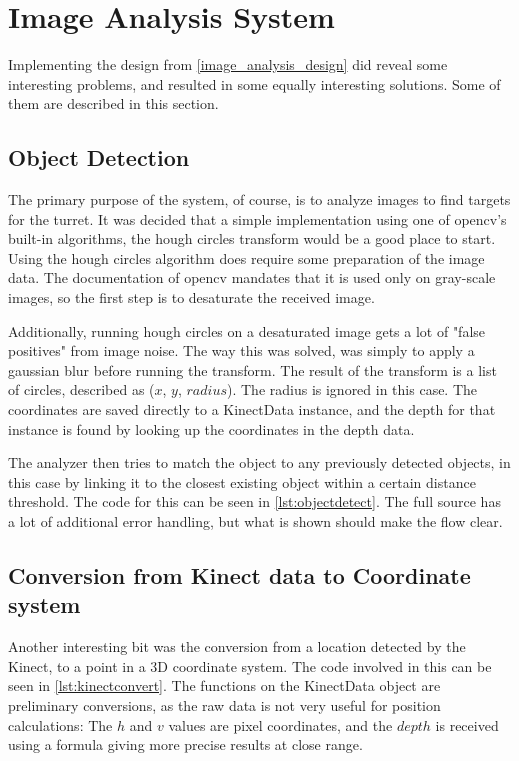 \section{Image Analysis System}

Implementing the design from \autoref{image_analysis_design} did reveal some interesting problems, and resulted in
some equally interesting solutions. Some of them are described in this section.

\subsection{Object Detection}
The primary purpose of the system, of course, is to analyze images to find targets for the turret. It was decided
that a simple implementation using one of \ac{opencv}'s built-in algorithms, the hough circles transform would
be a good place to start. Using the hough circles algorithm does require some preparation of the image data.
The documentation of \ac{opencv} mandates that it is used only on gray-scale images, so the first step is to
desaturate the received image.

Additionally, running hough circles on a desaturated image gets a lot of "false positives" from image noise. The way
this was solved, was simply to apply a gaussian blur before running the transform. The result of the transform is a
list of circles, described as ($x$, $y$, $radius$). The radius is ignored in this case. The coordinates are saved directly
to a KinectData instance, and the depth for that instance is found by looking up the coordinates in the depth data.

The analyzer then tries to match the object to any previously detected objects, in this case by linking it to the closest
existing object within a certain distance threshold. The code for this can be seen in \autoref{lst:objectdetect}. The
full source has a lot of additional error handling, but what is shown should make the flow clear.



\subsection{Conversion from Kinect data to Coordinate system}
Another interesting bit
was the conversion from a location detected by the Kinect, to a point in a 3D coordinate system. The code involved
in this can be seen in \autoref{lst:kinectconvert}. The functions on the KinectData object are preliminary conversions,
as the raw data is not very useful for position calculations: The $h$ and $v$ values are pixel coordinates, and the $depth$
is received using a formula giving more precise results at close range.

